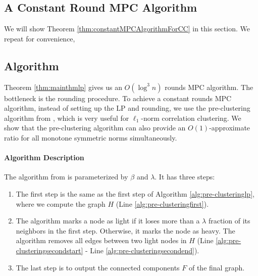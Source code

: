 \documentclass[11pt]{article}
\begin{document}
\begin{CJK*}{UTF8}{gbsn}
\section{A Constant Round MPC Algorithm}
\label{sec:MPC-solve-LP}
We will show Theorem \ref{thm:constantMPCAlgorithmForCC} in this section. We repeat for convenience, 
\thmconstantMPCAlgorithmForCC*



\subsection{Algorithm}
Theorem \ref{thm:mainthmlp} gives us an $O(\log^3 n)$ rounds MPC algorithm. The bottleneck is the rounding procedure. To achieve a constant rounds MPC algorithm, instead of setting up the LP and rounding, we use the pre-clustering algorithm from \cite{cohen2021correlation}, which is very useful for $\ell_1$-norm correlation clustering. We show that the pre-clustering algorithm can also provide an $O(1)$-approximate ratio for all monotone symmetric
norms simultaneously.

\paragraph{Algorithm Description} The algorithm from \cite{cohen2021correlation} is parameterized by $\beta$ and $\lambda$. It has three steps: 
\begin{enumerate}
    \item The first step is the same as the first step of Algorithm \ref{alg:pre-clusteringlp}, where we compute the graph $H$ (Line \ref{alg:pre-clusteringfirst}).
    \item The algorithm marks a node as light if it loses more than a $\lambda$ fraction of its neighbors in the first step. Otherwise, it marks the node as heavy. The algorithm removes all edges between two light nodes in $H$ (Line \ref{alg:pre-clusteringsecondstart} - Line \ref{alg:pre-clusteringsecondend}).
    \item The last step is to output the connected components $F$ of the final graph.
\end{enumerate}


\end{CJK*}
\end{document}

